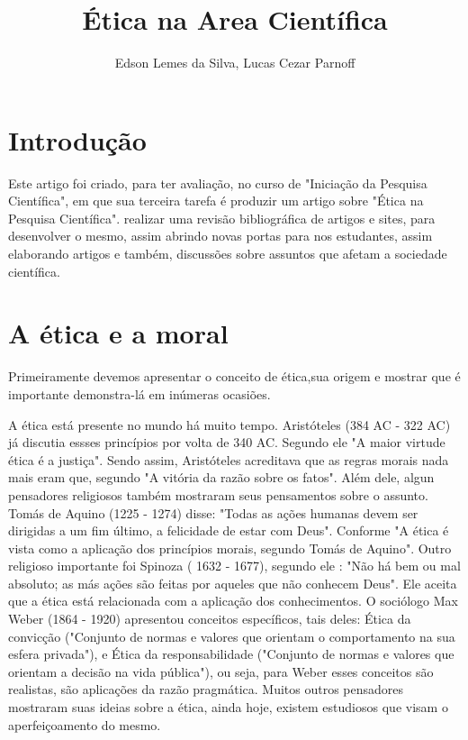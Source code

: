 \documentclass[12pt]{article}
\title{Ética na Area Cientí­fica}
\author{Edson Lemes da Silva\inst{1}, Lucas Cezar Parnoff\inst{1}}
\begin{document}
 

\maketitle

\begin{abstract}
  
\end{abstract}
     
\begin{resumo} 
  
\end{resumo}


\section{Introdução}\label{sec:introducao}

Este artigo foi criado, para ter avaliação,
no curso de "Iniciação da Pesquisa Científica",
em que sua terceira tarefa é produzir um artigo
sobre "Ética na Pesquisa Científica". 
realizar uma 
revisão bibliográfica de artigos e sites, 
para desenvolver o mesmo, assim abrindo novas portas
para nos estudantes, assim elaborando artigos e
também, discussões sobre assuntos que afetam a 
sociedade científica.  

\section{A ética e a moral}\label{sec:conteudo}


Primeiramente devemos apresentar o conceito de ética,sua origem e mostrar que é importante demonstra-lá em inúmeras ocasiões.

A ética está presente no mundo há muito tempo. Aristóteles  (384 AC - 322 AC) já discutia essses princípios por volta de 340 AC. Segundo ele "A maior virtude ética é a justiça". Sendo assim, Aristóteles acreditava que as regras morais nada mais eram que, segundo \cite{FABIO} "A vitória da razão sobre os fatos". Além dele, algun pensadores religiosos também mostraram seus pensamentos sobre o assunto. Tomás de Aquino (1225 - 1274) disse: "Todas as ações humanas devem ser dirigidas a um fim último, a felicidade de estar com Deus". Conforme \cite{ORLANDO} "A ética é vista como a aplicação dos princípios morais, segundo Tomás de Aquino". Outro religioso importante foi Spinoza ( 1632 - 1677), segundo ele : "Não há bem ou mal absoluto; as más ações são feitas por aqueles que não conhecem Deus". Ele aceita que a ética está relacionada com a aplicação dos conhecimentos. O sociólogo Max Weber (1864 - 1920) apresentou conceitos específicos, tais deles: Ética da convicção ("Conjunto de normas e valores que orientam o comportamento na sua esfera privada"), e Ética da responsabilidade ("Conjunto de normas e valores que orientam a decisão na vida pública"), ou seja, para Weber esses conceitos são realistas, são aplicações da razão pragmática. Muitos outros pensadores mostraram suas ideias sobre a ética, ainda hoje, existem estudiosos que visam o aperfeiçoamento do mesmo.
\end{document}
